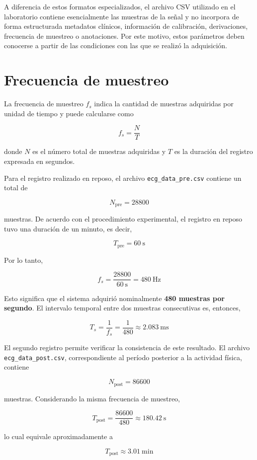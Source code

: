 \documentclass[12pt,a4paper]{article}
\begin{document}
A diferencia de estos formatos especializados, el archivo CSV utilizado en el
laboratorio contiene esencialmente las muestras de la señal y no incorpora de
forma estructurada metadatos clínicos, información de calibración, derivaciones,
frecuencia de muestreo o anotaciones. Por este motivo, estos parámetros deben
conocerse a partir de las condiciones con las que se realizó la adquisición.


\section{Frecuencia de muestreo}

La frecuencia de muestreo $f_s$ indica la cantidad de muestras adquiridas por
unidad de tiempo y puede calcularse como

\[
f_s = \frac{N}{T}
\]

donde $N$ es el número total de muestras adquiridas y $T$ es la duración del
registro expresada en segundos.

Para el registro realizado en reposo, el archivo \texttt{ecg\_data\_pre.csv}
contiene un total de

\[
N_{\mathrm{pre}} = 28800
\]

muestras. De acuerdo con el procedimiento experimental, el registro en reposo
tuvo una duración de un minuto, es decir,

\[
T_{\mathrm{pre}} = 60~\mathrm{s}
\]

Por lo tanto,

\[
f_s =
\frac{28800}{60~\mathrm{s}}
=
480~\mathrm{Hz}
\]

Esto significa que el sistema adquirió nominalmente \textbf{480 muestras por
segundo}. El intervalo temporal entre dos muestras consecutivas es, entonces,

\[
T_s = \frac{1}{f_s}
     = \frac{1}{480}
     \approx 2.083~\mathrm{ms}
\]

El segundo registro permite verificar la consistencia de este resultado. El
archivo \texttt{ecg\_data\_post.csv}, correspondiente al período posterior a la
actividad física, contiene

\[
N_{\mathrm{post}} = 86600
\]

muestras. Considerando la misma frecuencia de muestreo,

\[
T_{\mathrm{post}}
=
\frac{86600}{480}
\approx
180.42~\mathrm{s}
\]

lo cual equivale aproximadamente a

\[
T_{\mathrm{post}} \approx 3.01~\mathrm{min}
\]
\end{document}
